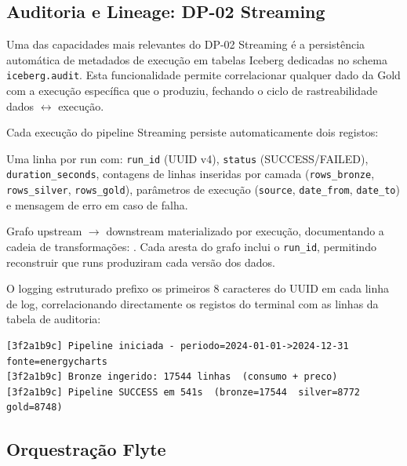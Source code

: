 \documentclass[11pt,a4paper]{article}
\begin{document}
\subsection{Auditoria e Lineage: DP-02 Streaming}

Uma das capacidades mais relevantes do DP-02 Streaming é a persistência automática de metadados de execução em tabelas Iceberg dedicadas no schema \texttt{iceberg.audit}. Esta funcionalidade permite correlacionar qualquer dado da Gold com a execução específica que o produziu, fechando o ciclo de rastreabilidade dados $\leftrightarrow$ execução.

Cada execução do pipeline Streaming persiste automaticamente dois registos:

\begin{description}[style=nextline,leftmargin=0pt,labelwidth=0pt]
  \item[\texttt{audit.pipeline\_runs}] Uma linha por run com: \texttt{run\_id} (UUID v4), \texttt{status} (SUCCESS/FAILED), \texttt{duration\_seconds}, contagens de linhas inseridas por camada (\texttt{rows\_bronze}, \texttt{rows\_silver}, \texttt{rows\_gold}), parâmetros de execução (\texttt{source}, \texttt{date\_from}, \texttt{date\_to}) e mensagem de erro em caso de falha.
  \item[\texttt{audit.dataset\_lineage}] Grafo upstream $\rightarrow$ downstream materializado por execução, documentando a cadeia de transformações: . Cada aresta do grafo inclui o \texttt{run\_id}, permitindo reconstruir que runs produziram cada versão dos dados.
\end{description}

O logging estruturado prefixo os primeiros 8 caracteres do UUID em cada linha de log, correlacionando directamente os registos do terminal com as linhas da tabela de auditoria:

\begin{lstlisting}
[3f2a1b9c] Pipeline iniciada - periodo=2024-01-01->2024-12-31  fonte=energycharts
[3f2a1b9c] Bronze ingerido: 17544 linhas  (consumo + preco)
[3f2a1b9c] Pipeline SUCCESS em 541s  (bronze=17544  silver=8772  gold=8748)
\end{lstlisting}

\subsection{Orquestração Flyte}
\end{document}

